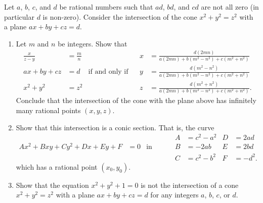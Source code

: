 \documentclass[12 pt, letterpaper]{hmcpset}
\begin{document}
\begin{problem}[2]
	Let $a$, $b$, $c$, and $d$ be rational numbers such that $ad$, $bd$, and $cd$ are not all zero (in particular $d$ is non-zero). Consider the intersection of the cone $x^{2} + y^{2} = z^{2}$ with a plane $ax + by + cz = d$.
	\begin{enumerate}
		\item Let $m$ and $n$ be integers. Show that
			\begin{align*}
				\frac{x}{z - y} & = \frac{m}{n} & & & x & = \frac{d (2 m n)}{a (2 m n) + b (m^{2} - n^{2}) + c(m^{2} + n^{2})} \\
				ax + by + cz & = d & \text{if and only if} & & y & = \frac{d (m^{2} - n^{2})}{a (2 m n) + b (m^{2} - n^{2}) + c(m^{2} + n^{2})} \\
				x^{2} + y^{2} & = z^{2} & & & z & = \frac{d (m^{2} + n^{2})}{a (2 m n) + b (m^{2} - n^{2}) + c(m^{2} + n^{2})}.
			\end{align*}
			Conclude that the intersection of the cone with the plane above has infinitely many rational points $(x, y, z)$.
		\item Show that this intersection is a conic section. That is, the curve
			\begin{align*}
				& & & & A & = c^{2} - a^{2} & D & = 2 a d \\
				A x^{2} + B x y + C y^{2} + D x + E y + F & = 0 & \text{in terms of} & & B & = -2 a b & E & = 2 b d \\
									  & & & & C & = c^{2} - b^{2} & F & = -d^{2}.
			\end{align*}
			which has a rational point $(x_{0}, y_{0})$.
		\item Show that the equation $x^{2} + y^{2} + 1 = 0$ is not the intersection of a cone $x^{2} + y^{2} = z^{2}$ with a plane $ax + by + cz = d$ for any integers $a$, $b$, $c$, or $d$. 
	\end{enumerate}
\end{problem}
\end{document}
